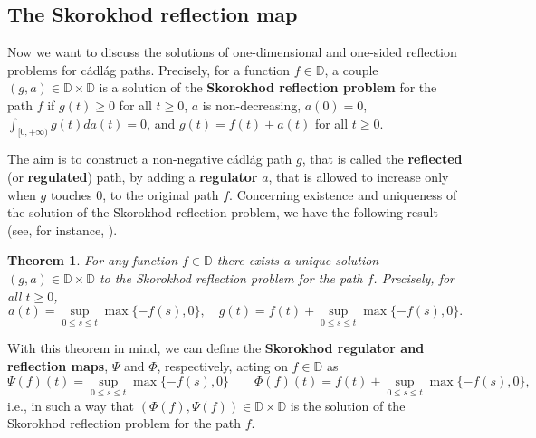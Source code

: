 \documentclass[]{amsart}
\numberwithin{equation}{section}
\newtheorem{thm}{Theorem}[section]
\theoremstyle{remark}
\theoremstyle{definition}
\begin{document}
\subsection{The Skorokhod reflection map}\label{sec:SRM}
Now we want to discuss the solutions of one-dimensional and one-sided reflection problems for c\'adl\'ag paths. Precisely, for a function $f \in \mathbb{D}$, a couple $(g,a) \in \mathbb{D} \times \mathbb{D}$ is a solution of the \textbf{Skorokhod reflection problem} for the path $f$ if $g(t)\ge 0$ for all $t \ge 0$, $a$ is non-decreasing, $a(0)=0$, $\int_{[0,+\infty)}g(t)da(t)=0$, and $g(t)=f(t)+a(t)$ for all $t \ge 0$.

The aim is to construct a non-negative c\'adl\'ag path $g$, that is called the \textbf{reflected} (or \textbf{regulated}) path, by adding a \textbf{regulator} $a$, that is allowed to increase only when $g$ touches $0$, to the original path $f$. Concerning existence and uniqueness of the solution of the Skorokhod reflection problem, we have the following result (see, for instance, \cite{tanaka1979stochastic}).
\begin{thm}
	For any function $f \in \mathbb{D}$ there exists a unique solution $(g,a) \in \mathbb{D} \times \mathbb{D}$ to the Skorokhod reflection problem for the path $f$. Precisely, for all $t \ge 0$,
	\begin{equation*}
		a(t)=\sup_{0 \le s \le t}\max\{-f(s),0\}, \quad g(t)=f(t)+\sup_{0 \le s \le t}\max\{-f(s),0\}.
	\end{equation*}
\end{thm}
With this theorem in mind, we can define the \textbf{Skorokhod regulator and reflection maps}, $\Psi$ and $\Phi$, respectively, acting on $f \in \mathbb{D}$ as
\begin{equation*}
	\Psi(f)(t)=\sup_{0 \le s \le t}\max\{-f(s),0\} \qquad \Phi(f)(t)=f(t)+\sup_{0 \le s \le t}\max\{-f(s),0\},
\end{equation*}
i.e., in such a way that $(\Phi(f),\Psi(f)) \in \mathbb{D} \times \mathbb{D}$ is the solution of the Skorokhod reflection problem for the path $f$.
\end{document}

